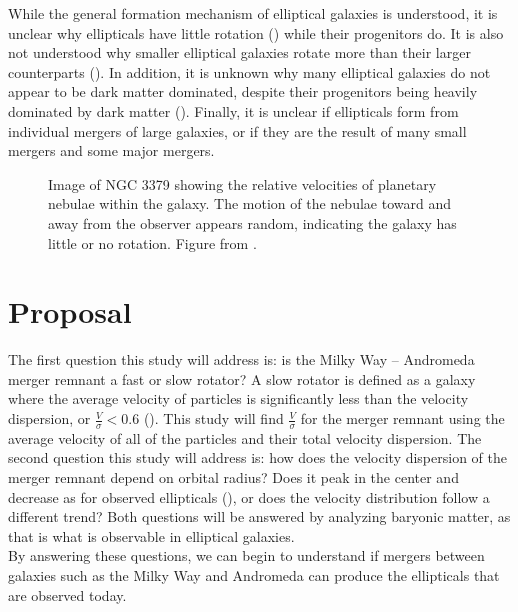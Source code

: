 \documentclass[twocolumn]{aastex63}
\begin{document}
While the general formation mechanism of elliptical galaxies is understood, it is unclear why ellipticals have little rotation (\cite{1998A&AS..133..325G}) while their progenitors do. It is also not understood why smaller elliptical galaxies rotate more than their larger counterparts (\cite{2011MNRAS.414..888E}). In addition, it is unknown why many elliptical galaxies do not appear to be dark matter dominated, despite their progenitors being heavily dominated by dark matter (\cite{2003Sci...301.1696R}). Finally, it is unclear if ellipticals form from individual mergers of large galaxies, or if they are the result of many small mergers and some major mergers.

\begin{figure}
    \centering
    \caption{Image of NGC 3379 showing the relative velocities of planetary nebulae within the galaxy. The motion of the nebulae toward and away from the observer appears random, indicating the galaxy has little or no rotation. Figure from \cite{2003Sci...301.1696R}.}
    \label{dispersion}
\end{figure}

\section{Proposal}

The first question this study will address is: is the Milky Way -- Andromeda merger remnant a fast or slow rotator? A slow rotator is defined as a galaxy where the average velocity of particles is significantly less than the velocity dispersion, or $\frac{V}{\sigma}<0.6$ (\cite{sparke2007galaxies}). This study will find $\frac{V}{\sigma}$ for the merger remnant using the average velocity of all of the particles and their total velocity dispersion. The second question this study will address is: how does the velocity dispersion of the merger remnant depend on orbital radius? Does it peak in the center and decrease as for observed ellipticals (\cite{10.1093/mnras/stt442}), or does the velocity distribution follow a different trend? Both questions will be answered by analyzing baryonic matter, as that is what is observable in elliptical galaxies.\\

By answering these questions, we can begin to understand if mergers between galaxies such as the Milky Way and Andromeda can produce the ellipticals that are observed today.\\
\end{document}
